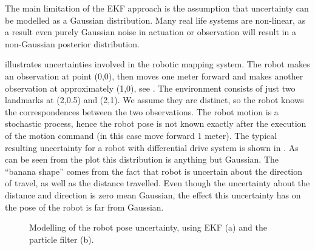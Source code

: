 The main limitation of the EKF approach is the assumption that
uncertainty can be modelled as a Gaussian distribution. Many real life
systems are non-linear, as a result even purely Gaussian noise in
actuation or observation will result in a non-Gaussian posterior
distribution.  

 illustrates uncertainties involved in the 
robotic mapping system. The robot makes an observation at point (0,0),
then moves one meter forward and makes another observation at
approximately (1,0), see . The environment
consists of just two landmarks at (2,0.5) and (2,1). We assume they
are distinct, so the robot knows the correspondences between the two
observations. The robot motion is a stochastic process, hence the
robot pose is not known exactly after the execution of the motion
command (in this case move forward 1 meter). The typical resulting
uncertainty for a robot with differential drive system is shown in
. As can be seen from the plot  this 
distribution is anything but Gaussian. The ``banana shape'' comes from
the fact that robot is uncertain about the direction of travel, as
well as the distance travelled. Even though the uncertainty about
the distance and direction is zero mean Gaussian, the effect this
uncertainty has on the pose of the robot is far from Gaussian.

\begin{figure}
\begin{center}
\quad
{}
\end{center}

\caption{Modelling of the robot pose uncertainty,
 using EKF (a) and the particle filter (b).
}
\label{fig:post_ekf_vs_pf}
\end{figure}


